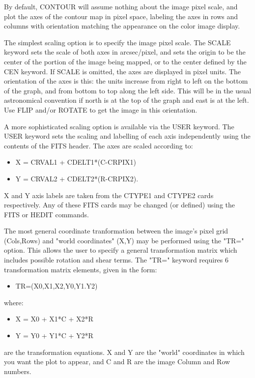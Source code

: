  
By default, CONTOUR will assume nothing about the image pixel scale, and
plot the axes of the contour map in pixel space, labeling the axes in rows
and columns with orientation matching the appearance on the color image
display.
 
The simplest scaling option is to specify the image pixel scale.  The SCALE
keyword sets the scale of both axes in arcsec/pixel, and sets the origin to
be the center of the portion of the image being mapped, or to the center
defined by the CEN keyword.  If SCALE is omitted, the axes are displayed in
pixel units.  The orientation of the axes is this: the units increase from
right to left on the bottom of the graph, and from bottom to top along the
left side.  This will be in the usual astronomical convention if north is
at the top of the graph and east is at the left.  Use FLIP and/or ROTATE to
get the image in this orientation.
 
A more sophisticated scaling option is available via the USER keyword. The
USER keyword sets the scaling and labelling of each axis independently
using the contents of the FITS header.  The axes are scaled according to:
\begin{itemize} 
  \item{X = CRVAL1 + CDELT1*(C-CRPIX1)}
  \item{Y = CRVAL2 + CDELT2*(R-CRPIX2).}
\end{itemize} 
X and Y axis labels are taken from the CTYPE1 and CTYPE2 cards
respectively.  Any of these FITS cards may be changed (or defined) using
the FITS or HEDIT commands.
 
The most general coordinate tranformation between the image's pixel grid
(Cols,Rows) and "world coordinates" (X,Y) may be performed using the "TR="
option.  This allows the user to specify a general transformation matrix
which includes possible rotation and shear terms.  The "TR=" keyword
requires 6 transformation matrix elements, given in the form:
\begin{itemize} 
  \item{TR=(X0,X1,X2,Y0,Y1.Y2)}
\end{itemize}
where:
\begin{itemize} 
  \item{X = X0 + X1*C + X2*R}
  \item{Y = Y0 + Y1*C + Y2*R}
\end{itemize}
are the transformation equations.  X and Y are the "world" coordinates in
which you want the plot to appear, and C and R are the image Column and Row
numbers.
 
